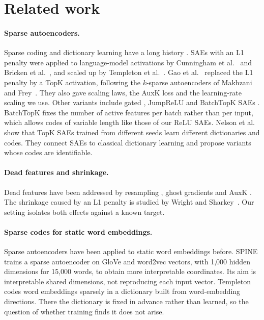 \documentclass[11pt]{article}
\begin{document}
\section{Related work}
\label{sec:related}

\paragraph{Sparse autoencoders.} Sparse coding and dictionary learning have a long history \cite{olshausen1996emergence,aharon2006ksvd}. SAEs with an L1 penalty were applied to language-model activations by Cunningham et al.~\cite{cunningham2023sparse} and Bricken et al.~\cite{bricken2023monosemanticity}, and scaled up by Templeton et al.~\cite{templeton2024scaling}. Gao et al.~\cite{gao2024scaling} replaced the L1 penalty by a TopK activation, following the $k$-sparse autoencoders of Makhzani and Frey~\cite{makhzani2013ksparse}. They also gave scaling laws, the AuxK loss and the learning-rate scaling we use. Other variants include gated \cite{rajamanoharan2024gated}, JumpReLU \cite{rajamanoharan2024jumprelu} and BatchTopK SAEs \cite{bussmann2024batchtopk}. BatchTopK fixes the number of active features per batch rather than per input, which allows codes of variable length like those of our ReLU SAEs. Nelson et al.~\cite{nelson2026identifiable} show that TopK SAEs trained from different seeds learn different dictionaries and codes. They connect SAEs to classical dictionary learning and propose variants whose codes are identifiable.

\paragraph{Dead features and shrinkage.} Dead features have been addressed by resampling \cite{bricken2023monosemanticity}, ghost gradients \cite{jermyn2024ghost} and AuxK \cite{gao2024scaling}. The shrinkage caused by an L1 penalty is studied by Wright and Sharkey~\cite{wright2024suppression}. Our setting isolates both effects against a known target.

\paragraph{Sparse codes for static word embeddings.} Sparse autoencoders have been applied to static word embeddings before. SPINE \cite{subramanian2018spine} trains a sparse autoencoder on GloVe and word2vec vectors, with 1,000 hidden dimensions for 15,000 words, to obtain more interpretable coordinates. Its aim is interpretable shared dimensions, not reproducing each input vector. Templeton~\cite{templeton2020word} codes word embeddings sparsely in a dictionary built from word-embedding directions. There the dictionary is fixed in advance rather than learned, so the question of whether training finds it does not arise.
\end{document}
